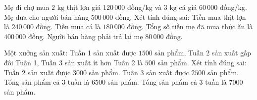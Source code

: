 \begin{ex} %
Mẹ đi chợ mua $2\text{ kg}$ thịt lợn giá $120\,000$ đồng/kg và $3\text{ kg}$ cá giá $60\,000$ đồng/kg. Mẹ đưa cho người bán hàng $500\,000$ đồng. Xét tính đúng sai:
\choiceTF
{\True Tiền mua thịt lợn là $240\,000$ đồng.}
{\True Tiền mua cá là $180\,000$ đồng.}
{Tổng số tiền mẹ đã mua thức ăn là $400\,000$ đồng.}
{\True Người bán hàng phải trả lại mẹ $80\,000$ đồng.}
\end{ex}

\begin{ex} %
Một xưởng sản xuất: Tuần 1 sản xuất được $1500$ sản phẩm, Tuần 2 sản xuất gấp đôi Tuần 1, Tuần 3 sản xuất ít hơn Tuần 2 là $500$ sản phẩm. Xét tính đúng sai:
\choiceTF
{\True Tuần 2 sản xuất được $3000$ sản phẩm.}
{\True Tuần 3 sản xuất được $2500$ sản phẩm.}
{Tổng sản phẩm cả 3 tuần là $6500$ sản phẩm.}
{\True Tổng sản phẩm cả 3 tuần là $7000$ sản phẩm.}
\end{ex}

